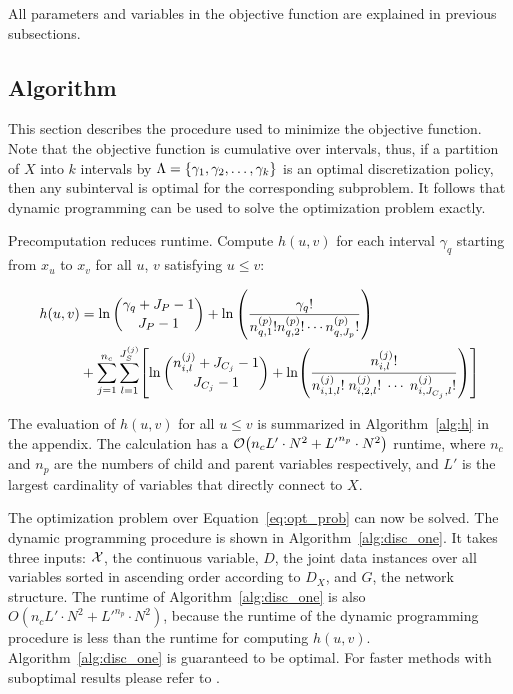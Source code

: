All parameters and variables in the objective function are explained in previous subsections.

\subsection{Algorithm}

This section describes the procedure used to minimize the objective function.
Note that the objective function is cumulative over intervals, thus, if a partition of $X$ into $k$ intervals by $\Lambda = \curly{\gamma_1 , \gamma_2  , \ldots , \gamma_k}$ is an optimal discretization policy, then any subinterval is optimal for the corresponding subproblem.
It follows that dynamic programming can be used to solve the optimization problem exactly.

Precomputation reduces runtime.
Compute $h(u,v)$ for each interval $\gamma_q$ starting from $x_{u}$ to $x_{v}$ for all $u$, $v$ satisfying $u \leq v$:

\begin{small}
  \begin{equation}
  \begin{aligned}
  h(u,v) &=  \ln {{\gamma_{q} + J_P - 1}\choose{J_P-1}} + \ln \left( { {{\gamma_q}!}\over{ {n^{(p)}_{q,1} !} {n^{(p)}_{q,2} !} \cdots {n^{(p)}_{q,J_p} !}} } \right) \\
  & + \sum_{j=1}^{n_c} \sum_{l=1}^{J^{(j)}_S} \brock{
    { \ln
            {{n^{(j)}_{i,l} + J_{C_j} - 1}\choose{J_{C_j}-1}}}
      +
      \ln \paren{ {
            \frac{
              {n^{(j)}_{i,l}}!
            }{
              {n^{(j)}_{i,1,l}!} \; {n^{(j)}_{i,2,l}!} \; \cdots \; {n^{(j)}_{i,J_{C_j},l}!}
            }
          }
          } }
  \end{aligned}
  \end{equation}
\end{small}

The evaluation of $h(u,v)$ for all $u \leq v$ is summarized in Algorithm~\ref{alg:h} in the appendix.
The calculation has a $\bigo \paren{ n_c  {L'} \cdot N^2 + {L'}^{n_p} \cdot N^2 }$ runtime, where $n_c$ and $n_p$ are the numbers of child and parent variables respectively, and $L'$ is the largest cardinality of variables that directly connect to $X$. 

The optimization problem over Equation~\ref{eq:opt_prob} can now be solved.
The dynamic programming procedure is shown in Algorithm~\ref{alg:disc_one}.
It takes three inputs: $\mathcal{X}$, the continuous variable, $D$, the joint data instances over all variables sorted in ascending order according to $D_X$, and $G$, the network structure.
The runtime of Algorithm~\ref{alg:disc_one} is also $O(n_c  {L'} \cdot N^2 + {L'}^{n_p} \cdot N^2)$, because the runtime of the dynamic programming procedure is less than the runtime for computing $h(u,v)$.
Algorithm~\ref{alg:disc_one} is guaranteed to be optimal.
For faster methods with suboptimal results please refer to \citep{Boulle_2006}.

